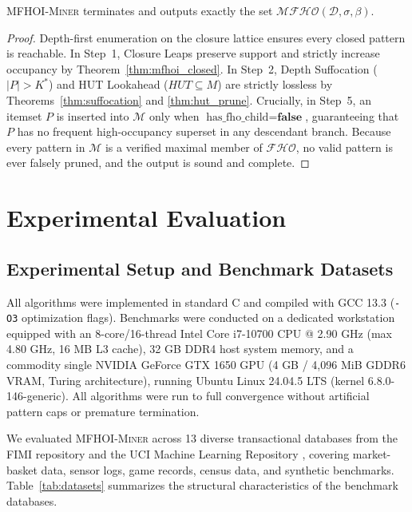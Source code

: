 \documentclass[runningheads,orivec]{llncs}
\newcommand{\FHO}{\ensuremath{\mathcal{FHO}}}
\newcommand{\MFHOI}{\ensuremath{\mathcal{MFHO}}}
\newcommand{\MFHOIMiner}{\textsc{MFHOI-Miner}}
\begin{document}
\begin{theorem}
\label{thm:correctness}
\MFHOIMiner{} terminates and outputs exactly the set $\MFHOI(\mathcal{D}, \sigma, \beta)$.
\end{theorem}
\begin{proof}
Depth-first enumeration on the closure lattice ensures every closed pattern is reachable. 
In Step~1, Closure Leaps preserve support and strictly increase occupancy by Theorem~\ref{thm:mfhoi_closed}.
In Step~2, Depth Suffocation ($|P| > K^*$) and HUT Lookahead ($HUT \subseteq M$) are strictly lossless by Theorems~\ref{thm:suffocation} and \ref{thm:hut_prune}.
Crucially, in Step~5, an itemset $P$ is inserted into $\mathcal{M}$ only when $\text{has\_fho\_child} = \textbf{false}$, guaranteeing that $P$ has no frequent high-occupancy superset in any descendant branch.
Because every pattern in $\mathcal{M}$ is a verified maximal member of $\FHO$, no valid pattern is ever falsely pruned, and the output is sound and complete.
\end{proof}

\section{Experimental Evaluation}
\label{sec:exp}

\subsection{Experimental Setup and Benchmark Datasets}

All algorithms were implemented in standard C and compiled with GCC 13.3 (\texttt{-O3} optimization flags). Benchmarks were conducted on a dedicated workstation equipped with an 8-core/16-thread Intel Core i7-10700 CPU @ 2.90 GHz (max 4.80 GHz, 16 MB L3 cache), 32 GB DDR4 host system memory, and a commodity single NVIDIA GeForce GTX 1650 GPU (4 GB / 4,096 MiB GDDR6 VRAM, Turing architecture), running Ubuntu Linux 24.04.5 LTS (kernel 6.8.0-146-generic). All algorithms were run to full convergence without artificial pattern caps or premature termination.

We evaluated \MFHOIMiner{} across 13 diverse transactional databases from the FIMI repository \cite{fimi2003repository} and the UCI Machine Learning Repository \cite{ucirepository1981}, covering market-basket data, sensor logs, game records, census data, and synthetic benchmarks. Table~\ref{tab:datasets} summarizes the structural characteristics of the benchmark databases.
\end{document}
